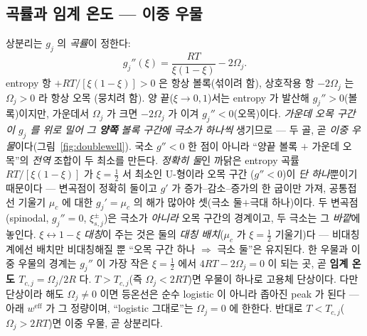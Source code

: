 \documentclass[11pt,a4paper]{article}
\newcommand{\eff}{\mathrm{eff}}
\begin{document}
\subsection{곡률과 임계 온도 — 이중 우물}
상분리는 $g_j$ 의 \emph{곡률}이 정한다:
\begin{equation}
g_j''(\xi)=\frac{RT}{\xi(1-\xi)}-2\Omega_j.
\label{eq:regsol_gpp}
\end{equation}
entropy 항 $+RT/[\xi(1-\xi)]>0$ 은 항상 볼록(섞이려 함), 상호작용 항 $-2\Omega_j$ 는 $\Omega_j>0$ 라 항상 오목
(뭉치려 함). 양 끝($\xi\to0,1$)서는 entropy 가 발산해 $g_j''>0$(볼록)이지만, 가운데서 $\Omega_j$ 가 크면 $-2\Omega_j$ 가
이겨 $g_j''<0$(오목)이다. \emph{가운데 오목 구간이 $g_j$ 를 위로 밀어 그 \textbf{양쪽} 볼록 구간에 극소가 하나씩} 생기므로
— 두 골, 곧 \emph{이중 우물}이다(그림~\ref{fig:doublewell}). 국소 $g''<0$ 한 점이 아니라 ``양끝 볼록 $+$ 가운데 오목''의 \emph{전역} 조합이 두 최소를
만든다. \emph{정확히 둘}인 까닭은 entropy 곡률 $RT/[\xi(1-\xi)]$ 가 $\xi=\tfrac12$ 서 최소인 U-형이라 오목 구간
($g''<0$)이 \emph{단 하나}뿐이기 때문이다 — 변곡점이 정확히 둘이고 $g'$ 가 증가–감소–증가의 한 굽이만 가져, 공통접선
기울기 $\mu_c$ 에 대한 $g_j'=\mu_c$ 의 해가 많아야 셋(극소 둘$+$극대 하나)이다. 두 변곡점(spinodal, $g_j''=0$,
$\xi_{s,j}^\pm$)은 극소가 \emph{아니라} 오목 구간의 경계이고, 두 극소는 그 \emph{바깥}에 놓인다. $\xi\!\leftrightarrow\!
1-\xi$ \emph{대칭}이 주는 것은 둘의 \emph{대칭 배치}($\mu_c$ 가 $\xi=\tfrac12$ 기울기)다 — 비대칭계에선 배치만
비대칭해질 뿐 ``오목 구간 하나 $\Rightarrow$ 극소 둘''은 유지된다. 한 우물과 이중 우물의 경계는 $g_j''$ 이 가장 작은 $\xi=\tfrac12$ 에서 $4RT-2\Omega_j=0$ 이 되는 곳, 곧
\textbf{임계 온도 $T_{c,j}=\Omega_j/2R$} 다. $T>T_{c,j}$(즉 $\Omega_j<2RT$)면 우물이 하나로 고용체 단상이다.
다만 단상이라 해도 $\Omega_j\ne0$ 이면 등온선은 순수 logistic 이 아니라 좁아진 peak 가 된다 — 아래 $w^\eff$ 가
그 정량이며, ``logistic 그대로''는 $\Omega_j=0$ 에 한한다. 반대로 $T<T_{c,j}$($\Omega_j>2RT$)면 이중 우물, 곧
상분리다.
\end{document}
